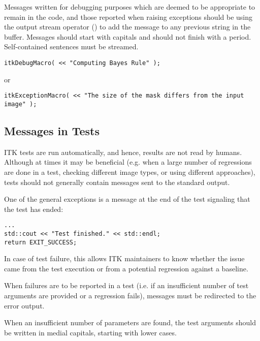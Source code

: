 Messages written for debugging purposes which are deemed to be appropriate to
remain in the code, and those reported when raising exceptions should be using
the output stream operator (\code{<<}) to add the message to any previous string
in the buffer. Messages should start with capitals and should not finish with a
period. Self-contained sentences must be streamed.

\small
\begin{verbatim}
itkDebugMacro( << "Computing Bayes Rule" );
\end{verbatim}
\normalsize

or

\small
\begin{verbatim}
itkExceptionMacro( << "The size of the mask differs from the input image" );
\end{verbatim}
\normalsize


\subsection{Messages in Tests}
\label{subsec:MessagesInTests}

ITK tests are run automatically, and hence, results are not read by humans.
Although at times it may be beneficial (e.g. when a large number of regressions
are done in a test, checking different image types, or using different
approaches), tests should not generally contain messages sent to the standard
output.

One of the general exceptions is a message at the end of the test signaling
that the test has ended:

\small
\begin{verbatim}
...
std::cout << "Test finished." << std::endl;
return EXIT_SUCCESS;
\end{verbatim}
\normalsize

In case of test failure, this allows ITK maintainers to know whether the issue
came from the test execution or from a potential regression against a baseline.

When failures are to be reported in a test (i.e. if an insufficient number of
test arguments are provided or a regression fails), messages must be redirected
to the error output.

When an insufficient number of parameters are found, the test arguments should
be written in medial capitals, starting with lower cases.

